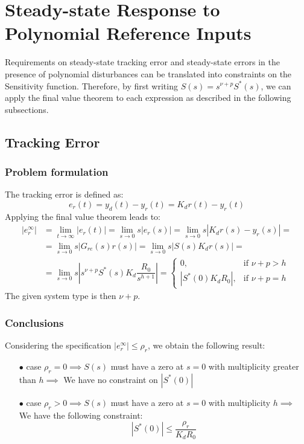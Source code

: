 \documentclass{article}
\numberwithin{equation}{subsection}
\begin{document}
	\section{Steady-state Response to Polynomial Reference Inputs}
	Requirements on steady-state tracking error and steady-state errors in the presence of polynomial disturbances can be translated into constraints on the Sensitivity function.
	Therefore, by first writing $S(s) = s^{\nu+p}S^*(s)$, we can apply the final value theorem to each expression as described in the following subsections.
	\subsection{Tracking Error}
	\subsubsection{Problem formulation}
	The tracking error is defined as:
	\begin{equation}
		e_r(t) = y_d(t)-y_r(t) = K_dr(t)-y_r(t)
	\end{equation}
	Applying the final value theorem leads to:
	\begin{align}
		\left| e_r^\infty \right| &= \displaystyle\lim_{t\to\infty} 	\left|e_r(t)\right| = \displaystyle\lim_{s\to0}s \left|e_r(s)\right| = \displaystyle\lim_{s\to0}s \left|K_dr(s)-y_r(s)\right| = \nonumber \\
		&= \displaystyle\lim_{s\to0}s \left|G_{re}(s)r(s)\right| = 	\displaystyle\lim_{s\to0}s \left|S(s)K_dr(s)\right| = \nonumber \\
		&= \displaystyle\lim_{s\to0}s 	\left|s^{\nu+p}S^*(s)K_d\dfrac{R_0}{s^{h+1}}\right| =
		\begin{cases}
			0, & \text{if } \nu+p>h \\
			\left|S^*(0)K_dR_0\right|, & \text{if } \nu+p = h
		\end{cases}
	\end{align}
	The given system type is then $\nu+p$.
	\subsubsection{Conclusions}
	Considering the specification $\left|e_r^\infty\right| \leq \rho_r  $, we obtain the following result:
	\begin{enumerate}
		\item[$\bullet$] case $\rho_r=0 \implies S(s)$ must have a zero at $s=0$ with multiplicity greater than $h \implies$ We have no constraint on $\left|S^*(0)\right| $ 
		\item[$\bullet$] case $\rho_r>0 \implies S(s)$ must have a zero at $s=0$ with multiplicity $h \implies$ We have the following constraint:
		\begin{equation}
			\left|S^*(0)\right| \leq \dfrac{\rho_r}{K_dR_0}	
		\end{equation}
	\end{enumerate}
	
\end{document}
